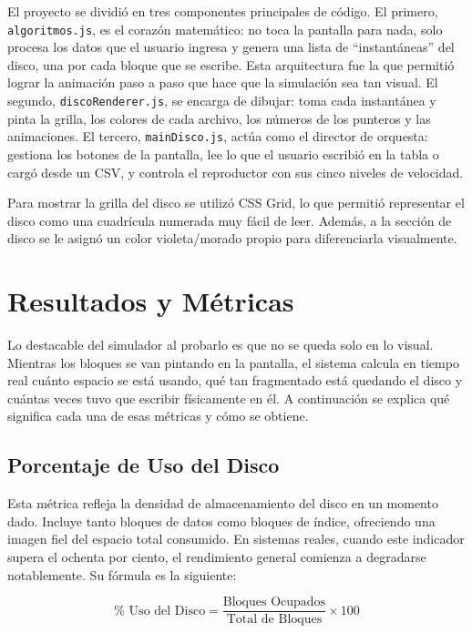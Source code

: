 \documentclass[12pt,a4paper]{article}
\begin{document}
El proyecto se dividió en tres componentes principales de código. El primero, \texttt{algoritmos.js}, es el corazón matemático: no toca la pantalla para nada, solo procesa los datos que el usuario ingresa y genera una lista de ``instantáneas'' del disco, una por cada bloque que se escribe. Esta arquitectura fue la que permitió lograr la animación paso a paso que hace que la simulación sea tan visual. El segundo, \texttt{discoRenderer.js}, se encarga de dibujar: toma cada instantánea y pinta la grilla, los colores de cada archivo, los números de los punteros y las animaciones. El tercero, \texttt{mainDisco.js}, actúa como el director de orquesta: gestiona los botones de la pantalla, lee lo que el usuario escribió en la tabla o cargó desde un CSV, y controla el reproductor con sus cinco niveles de velocidad.

Para mostrar la grilla del disco se utilizó CSS Grid, lo que permitió representar el disco como una cuadrícula numerada muy fácil de leer. Además, a la sección de disco se le asignó un color violeta/morado propio para diferenciarla visualmente.

\section{Resultados y Métricas}

Lo destacable del simulador al probarlo es que no se queda solo en lo visual. Mientras los bloques se van pintando en la pantalla, el sistema calcula en tiempo real cuánto espacio se está usando, qué tan fragmentado está quedando el disco y cuántas veces tuvo que escribir físicamente en él. A continuación se explica qué significa cada una de esas métricas y cómo se obtiene.

\subsection{Porcentaje de Uso del Disco}

Esta métrica refleja la densidad de almacenamiento del disco en un momento dado. Incluye tanto bloques de datos como bloques de índice, ofreciendo una imagen fiel del espacio total consumido. En sistemas reales, cuando este indicador supera el ochenta por ciento, el rendimiento general comienza a degradarse notablemente. Su fórmula es la siguiente:

\[
\% \text{ Uso del Disco} = \frac{\text{Bloques Ocupados}}{\text{Total de Bloques}} \times 100
\]
\end{document}
